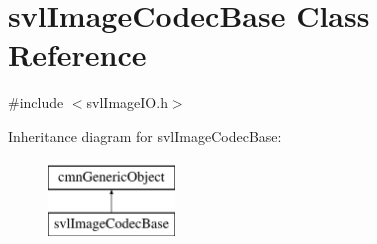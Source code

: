 \hypertarget{classsvl_image_codec_base}{}\section{svl\+Image\+Codec\+Base Class Reference}
\label{classsvl_image_codec_base}


{\ttfamily \#include $<$svl\+Image\+I\+O.\+h$>$}

Inheritance diagram for svl\+Image\+Codec\+Base\+:\begin{figure}[H]
\begin{center}
\leavevmode
\includegraphics[height=2.000000cm]{d7/d01/classsvl_image_codec_base}
\end{center}
\end{figure}
